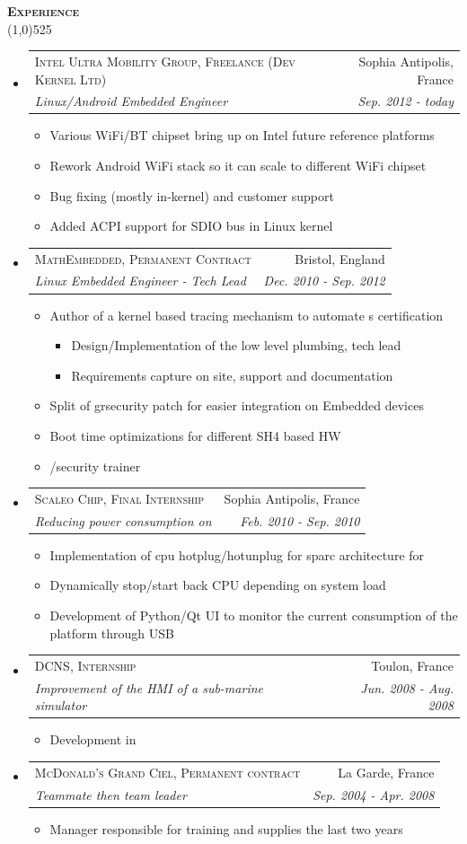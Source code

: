 \documentclass[letterpaper,11pt]{article}
\makeatletter
\newcommand{\resitem}[1]{\item #1}
\newcommand{\titlecolor}[0]{RoyalBlue4}
\newcommand{\bulletcolor}[0]{darkgray}
\newcommand{\resheading}[1]{
  \vspace{10pt}
  {\Large
        \textsc{\textcolor{\titlecolor}{\textbf{#1}}}
  } \\
  \vspace{-10.5pt}
  \hspace{-1pt}\textcolor{\titlecolor}{\line(1,0){525}}
}
\newcommand{\ressubheading}[4]{
  \vspace{12pt}
  \begin{tabular*}{7.0in}{l@{\extracolsep{\fill}}r}
    \textsc{#1} & #2 \\
    \textsl{#3} & \textit{#4} \\
  \end{tabular*}
  \vspace{4pt}
}
\newcommand{\prettylist}[0]{
  \begin{itemize}
    \renewcommand{\labelitemi}{{\tiny \textcolor{\bulletcolor}{$\bullet$}}}
    \renewcommand{\labelitemiii}{$\cdot$}
}
\newcommand{\acro}[1]{
  \hspace{-1pt}{\small\textsc{#1}}\hspace{-3pt}
}
\makeatother
\begin{document}
\vspace{5pt}
\resheading{Experience}
\vspace{3pt}
\prettylist
\item
  \ressubheading{Intel Ultra Mobility Group, Freelance (Dev Kernel Ltd)}{Sophia
    Antipolis, France}{Linux/Android Embedded Engineer}{Sep. 2012 - today}
  \begin{itemize}
    \resitem{Various WiFi/BT chipset bring up on Intel future reference platforms}
    \resitem{Rework Android WiFi stack so it can scale to different WiFi chipset}
    \resitem{Bug fixing (mostly in-kernel) and customer support}
    \resitem{Added ACPI support for SDIO bus in Linux kernel}
  \end{itemize}
\item
  \ressubheading{MathEmbedded, Permanent Contract}{Bristol, England}{ Linux
    Embedded Engineer - Tech Lead}{Dec. 2010 - Sep. 2012}
  \begin{itemize}
    \resitem{Author of a kernel based tracing mechanism to automate \acro{STB}s certification}
    \begin{itemize}
      \resitem{Design/Implementation of the low level plumbing, tech lead}
      \resitem{Requirements capture on site, support and documentation}
    \end{itemize}
    \resitem{Split of grsecurity patch for easier integration on Embedded devices}
    \resitem{Boot time optimizations for different SH4 based HW}
    \resitem{\acro{Linux}/security trainer}
  \end{itemize}
\vspace{1.1pt}\item
  \ressubheading{Scaleo Chip, Final Internship}{Sophia Antipolis,
    France}{Reducing power consumption on \acro{Linux-SMP SoC}}{Feb. 2010 -
    Sep. 2010}
  \begin{itemize}
    \resitem{Implementation of cpu hotplug/hotunplug for sparc architecture for \acro{Linux}} 
    \resitem{Dynamically stop/start back CPU depending on system load}
    \resitem{Development of Python/Qt UI to monitor the current consumption of the platform through USB}
  \end{itemize}
\vspace{1.1pt}\item
  \ressubheading{DCNS, Internship}{Toulon, France}{Improvement of the HMI of a sub-marine simulator}{Jun. 2008 - Aug. 2008}
  \begin{itemize}
    \resitem Development in\acro{OpenMotif/C}
  \end{itemize}
\item
  \ressubheading{McDonald's Grand Ciel, Permanent contract}{La Garde,
    France}{Teammate then team leader}{Sep. 2004 - Apr. 2008}
  \begin{itemize}
    \resitem Manager responsible for training and supplies the last two years
  \end{itemize}
\end{itemize}
\end{document}
